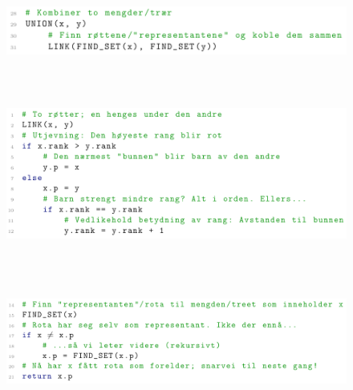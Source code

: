 \documentclass[12pt]{report}
\begin{document}
\vspace{\baselineskip}



\begin{figure}[H]
	\begin{Center}
		\includegraphics[width=6.34in,height=0.9in]{./media/image187.png}
	\end{Center}
\end{figure}



\par




\begin{figure}[H]
	\begin{Center}
		\includegraphics[width=6.3in,height=2.42in]{./media/image188.png}
	\end{Center}
\end{figure}



\par




\begin{figure}[H]
	\begin{Center}
		\includegraphics[width=6.3in,height=1.57in]{./media/image189.png}
	\end{Center}
\end{figure}
\end{document}
